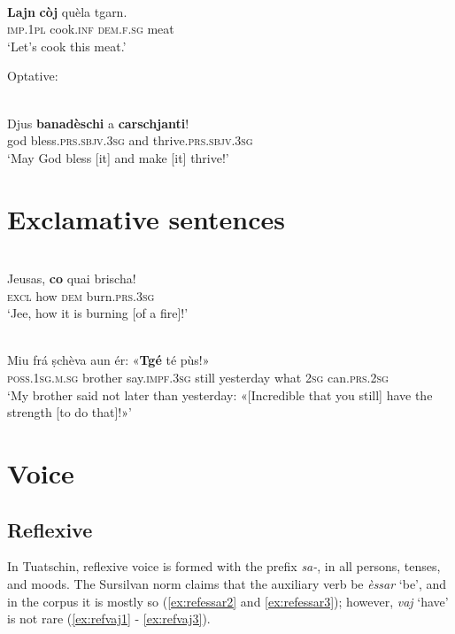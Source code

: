 \ea
\label{}
\\
\gll \textbf{Lajn} \textbf{còj} quèla tgarn.\\
\textsc{imp.1pl} cook.\textsc{inf} \textsc{dem.f.sg} meat\\
\glt `Let's cook this meat.'
\z

Optative:

\ea
\label{}
\\
\gll Djus \textbf{banadèschi} a \textbf{carschjanti}!\\
god bless.\textsc{prs.sbjv.3sg} and thrive.\textsc{prs.sbjv.3sg}\\
\glt `May God bless [it] and make [it] thrive!'
\z


\section{Exclamative sentences}

\ea\label{}
\\
\gll Jeusas, \textbf{co} quai brischa!   \\
   \textsc{excl} how \textsc{dem} burn.\textsc{prs.3sg}  \\
\glt `Jee, how it is burning [of a fire]!'
\z

\ea
\label{}
\\
\gll Miu frá ṣchèva aun ér: «\textbf{Tgé} té pùs!»   \\
\textsc{poss.1sg.m.sg} brother say.\textsc{impf.3sg} still yesterday what \textsc{2sg} can.\textsc{prs.2sg} \\
\glt `My brother said not later than yesterday: «[Incredible that you still] have the strength [to do that]!»'
\z

\section{Voice}

\subsection{Reflexive}

In Tuatschin, reflexive voice is formed with the prefix \textit{sa-}, in all persons, tenses, and moods. The Sursilvan norm claims that the auxiliary verb be \textit{èssar} `be', and in the corpus it is mostly so (\ref{ex:refessar2} and \ref{ex:refessar3}); however, \textit{vaj} `have' is not rare (\ref{ex:refvaj1} - \ref{ex:refvaj3}).

